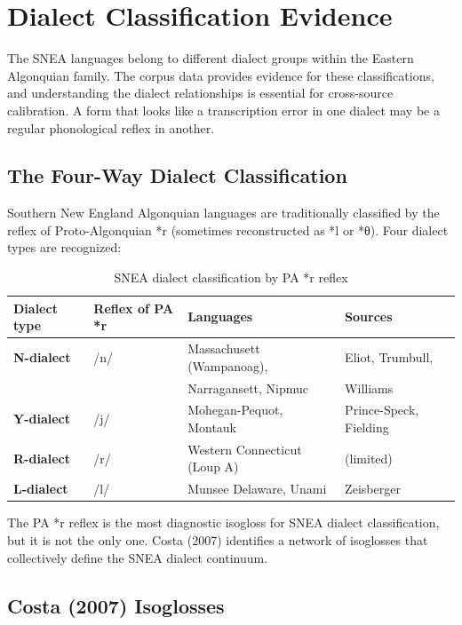 
\section{Dialect Classification Evidence}
\label{sec:dialect}

The SNEA languages belong to different dialect groups within the Eastern
Algonquian family. The corpus data provides evidence for these
classifications, and understanding the dialect relationships is essential
for cross-source calibration. A form that looks like a transcription error
in one dialect may be a regular phonological reflex in another.

\subsection{The Four-Way Dialect Classification}

Southern New England Algonquian languages are traditionally classified by
the reflex of Proto-Algonquian *r (sometimes reconstructed as *l or *θ).
Four dialect types are recognized:

\begin{table}[h]
\centering
\caption{SNEA dialect classification by PA *r reflex}
\label{tab:dialect-classification}
\begin{tabular}{llll}
\toprule
\textbf{Dialect type} & \textbf{Reflex of PA *r} & \textbf{Languages} & \textbf{Sources} \\
\midrule
\textbf{N-dialect} & /n/ & Massachusett (Wampanoag), & Eliot, Trumbull, \\
 & & Narragansett, Nipmuc & Williams \\
\textbf{Y-dialect} & /j/ & Mohegan-Pequot, Montauk & Prince-Speck, Fielding \\
\textbf{R-dialect} & /r/ & Western Connecticut (Loup A) & (limited) \\
\textbf{L-dialect} & /l/ & Munsee Delaware, Unami & Zeisberger \\
\bottomrule
\end{tabular}
\end{table}

The PA *r reflex is the most diagnostic isogloss for SNEA dialect
classification, but it is not the only one. Costa (2007) identifies a
network of isoglosses that collectively define the SNEA dialect continuum.

\subsection{Costa (2007) Isoglosses}


